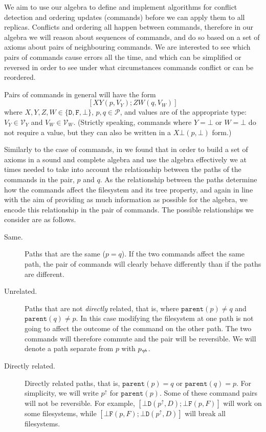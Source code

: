 \documentclass[12pt]{article}
\newcommand{\setvx}[1]{\mathcal{V}_{#1}}
\newcommand{\setp}{\mathcal{P}}
\newcommand{\empt}{\bot}
\newcommand{\parent}{\mathtt{parent}}
\newcommand{\pp}{p^\uparrow} %
\newcommand{\np}{p_{\centernot\leftrightarrow}} %
\newcommand{\fscommand}[2]{{#1#2}}
\newcommand{\fsregcommandchar}[1]{\mathtt{#1}}
\newcommand{\fsregcommand}[2]{\fscommand{\fsregcommandchar{#1}}{\fsregcommandchar{#2}}}
\newcommand{\cbf}{\fsregcommand{\empt}{F}}
\newcommand{\cbd}{\fsregcommand{\empt}{D}}
\newcommand{\cxy}{\fscommand{X}{Y}}
\newcommand{\czw}{\fscommand{Z}{W}}
\theoremstyle{definition}
\begin{document}
We aim to use our algebra to define and implement algorithms for conflict detection
and ordering updates (commands) before we can apply them to all replicas.
Conflicts and ordering all happen between commands, therefore in our algebra
we will reason about sequences of commands, 
and do so based on a set of axioms about pairs of neighbouring commands.
We are interested to see which pairs of commands cause errors all the time,
and which can be simplified or reversed
in order to see under what circumstances commands conflict or can be reordered.

Pairs of commands in general will have the form
\[ [\cxy(p,V_Y); \czw(q,V_W)] \]
where $X,Y,Z,W\in\{\fsregcommandchar{D},\fsregcommandchar{F},\empt\}$, $p,q\in\setp$, and values are of the appropriate type: 
$V_Y\in\setvx{Y}$ and $V_W\in\setvx{W}$.
(Strictly speaking, commands where $Y=\empt$ or $W=\empt$ do not require a value,
but they can also be written in a $\fscommand{X}{\empt}(p, \empt)$ form.)

Similarly to the case of commands, in \cite{NREC:alg} we found that in order to build
a set of axioms in a sound and complete algebra and use the algebra effectively we at times needed to take into account
the relationship between the paths of the commands in the pair, $p$ and $q$.
As the relationship between the paths determine how the commands affect the filesystem
and its tree property, 
and again in line with the aim of providing as much information as possible for the algebra,
we encode this relationship in the pair of commands. The possible relationships we
consider are as follows.

\begin{description}
\item[Same.] Paths that are the same ($p=q$). If the two commands affect the same path, the pair of commands
will clearly behave differently than if the paths are different.
%
\item[Unrelated.] Paths that are not \emph{directly} related,
that is, where $\parent(p)\neq q$ and $\parent(q)\neq p$. 
In this case modifying the filesystem at one path is not going
to affect the outcome of the command on the other path.
The two commands will therefore commute and the pair will be reversible.
We will denote a path separate from $p$ with $\np$.
%
\item[Directly related.] Directly related paths, that is, $\parent(p)=q$ or $\parent(q)=p$.
For simplicity, we will write $\pp$ for $\parent(p)$.
Some of these command pairs will not be reversible.
For example, $[\cbd(\pp,D);\cbf(p,F)]$ will work on some filesystems,
while $[\cbf(p,F);\cbd(\pp,D)]$ will break all filesystems.
\end{description}
\end{document}

